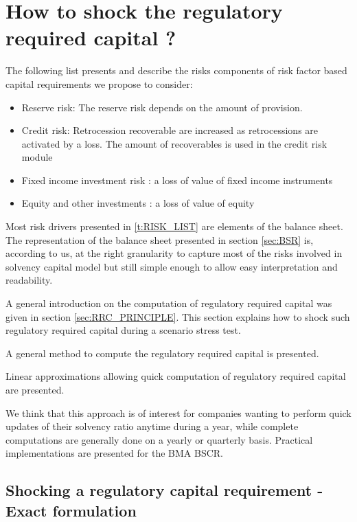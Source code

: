 \section{How to shock the regulatory required capital ?}
\label{sec:SHOCK_RC}

The following list presents and describe the risks components of risk factor based capital requirements we propose to consider:

\begin{itemize}
\itemsep0em 
\item Reserve risk: The reserve risk depends on the amount of provision.
\item Credit risk: Retrocession recoverable are increased as retrocessions are activated by a loss. The amount of recoverables is used in the credit risk module
 \item Fixed income investment risk : a loss of value of fixed income instruments 
 \item Equity and other investments : a loss of value of equity 
\end{itemize}


Most risk drivers presented in \ref{t:RISK_LIST} are elements of the balance sheet. The representation of the balance sheet presented in section \ref{sec:BSR} is, according to us, at the right granularity to capture most of the risks involved in solvency capital model but still simple enough to allow easy interpretation and readability.

A general introduction on the computation of regulatory required capital was given in section \ref{sec:RRC_PRINCIPLE}. This section explains how to shock such regulatory required capital during a scenario stress test. 


A general method to compute the regulatory required capital is presented. 

Linear approximations allowing quick computation of regulatory required capital are presented. 

We think that this approach is of interest for companies wanting to perform quick updates of their solvency ratio anytime during a year, while complete computations are generally done on a yearly or quarterly basis. Practical implementations are presented for the BMA BSCR.

\subsection{Shocking a regulatory capital requirement - Exact formulation}

